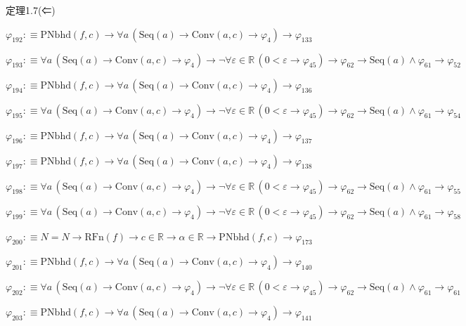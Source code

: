 \begin{fullproof}{定理1.7(⇐)}
\begin{abbrevlist}
\item $\varphi_{192} :\equiv \mathrm{PNbhd}(f,c) \to \forall a\,(\mathrm{Seq}(a) \to \mathrm{Conv}(a,c) \to \varphi_{4}) \to \varphi_{133}$
\item $\varphi_{193} :\equiv \forall a\,(\mathrm{Seq}(a) \to \mathrm{Conv}(a,c) \to \varphi_{4}) \to \neg \forall \varepsilon \in \mathbb{R}\,(0 < \varepsilon \to \varphi_{45}) \to \varphi_{62} \to \mathrm{Seq}(a) \land \varphi_{61} \to \varphi_{52}$
\item $\varphi_{194} :\equiv \mathrm{PNbhd}(f,c) \to \forall a\,(\mathrm{Seq}(a) \to \mathrm{Conv}(a,c) \to \varphi_{4}) \to \varphi_{136}$
\item $\varphi_{195} :\equiv \forall a\,(\mathrm{Seq}(a) \to \mathrm{Conv}(a,c) \to \varphi_{4}) \to \neg \forall \varepsilon \in \mathbb{R}\,(0 < \varepsilon \to \varphi_{45}) \to \varphi_{62} \to \mathrm{Seq}(a) \land \varphi_{61} \to \varphi_{54}$
\item $\varphi_{196} :\equiv \mathrm{PNbhd}(f,c) \to \forall a\,(\mathrm{Seq}(a) \to \mathrm{Conv}(a,c) \to \varphi_{4}) \to \varphi_{137}$
\item $\varphi_{197} :\equiv \mathrm{PNbhd}(f,c) \to \forall a\,(\mathrm{Seq}(a) \to \mathrm{Conv}(a,c) \to \varphi_{4}) \to \varphi_{138}$
\item $\varphi_{198} :\equiv \forall a\,(\mathrm{Seq}(a) \to \mathrm{Conv}(a,c) \to \varphi_{4}) \to \neg \forall \varepsilon \in \mathbb{R}\,(0 < \varepsilon \to \varphi_{45}) \to \varphi_{62} \to \mathrm{Seq}(a) \land \varphi_{61} \to \varphi_{55}$
\item $\varphi_{199} :\equiv \forall a\,(\mathrm{Seq}(a) \to \mathrm{Conv}(a,c) \to \varphi_{4}) \to \neg \forall \varepsilon \in \mathbb{R}\,(0 < \varepsilon \to \varphi_{45}) \to \varphi_{62} \to \mathrm{Seq}(a) \land \varphi_{61} \to \varphi_{58}$
\item $\varphi_{200} :\equiv N = N \to \mathrm{RFn}(f) \to c \in \mathbb{R} \to \alpha \in \mathbb{R} \to \mathrm{PNbhd}(f,c) \to \varphi_{173}$
\item $\varphi_{201} :\equiv \mathrm{PNbhd}(f,c) \to \forall a\,(\mathrm{Seq}(a) \to \mathrm{Conv}(a,c) \to \varphi_{4}) \to \varphi_{140}$
\item $\varphi_{202} :\equiv \forall a\,(\mathrm{Seq}(a) \to \mathrm{Conv}(a,c) \to \varphi_{4}) \to \neg \forall \varepsilon \in \mathbb{R}\,(0 < \varepsilon \to \varphi_{45}) \to \varphi_{62} \to \mathrm{Seq}(a) \land \varphi_{61} \to \varphi_{61}$
\item $\varphi_{203} :\equiv \mathrm{PNbhd}(f,c) \to \forall a\,(\mathrm{Seq}(a) \to \mathrm{Conv}(a,c) \to \varphi_{4}) \to \varphi_{141}$

\end{abbrevlist}
\end{fullproof}
